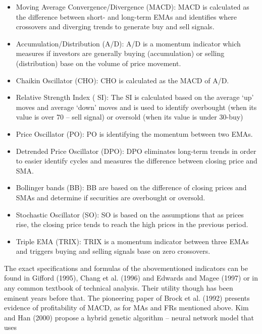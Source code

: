 \documentclass[12pt]{article}
\begin{document}
	\begin{itemize}
		\item Moving Average Convergence/Divergence (MACD):
		MACD is calculated as the
		difference between short- and long-term EMAs and identifies where crossovers and
		diverging trends to generate buy and sell signals.
		\item Accumulation/Distribution (A/D): A/D is a momentum indicator which measures if
		investors are generally buying (accumulation) or selling (distribution) base on the volume
		of price movement.
		\item Chaikin Oscillator (CHO): CHO is calculated as the MACD of A/D.
		
		\item Relative Strength Index ( SI): The SI is calculated based on the average ‘up’ moves and
		average ‘down’ moves and is used to identify overbought (when its value is over 70 – sell
		signal) or oversold (when its value is under 30-buy)
		
		\item Price Oscillator (PO): PO is identifying the momentum between two EMAs.
		
		\item Detrended Price Oscillator (DPO): DPO eliminates long-term trends in order to easier
		identify cycles and measures the difference between closing price and SMA.
		
		\item Bollinger bands (BB): BB are based on the difference of closing prices and SMAs and
		determine if securities are overbought or oversold.
		
		\item Stochastic Oscillator (SO): SO is based on the assumptions that as prices rise, the closing
		price tends to reach the high prices in the previous period.
		
		\item Triple EMA (TRIX): TRIX is a momentum indicator between three EMAs and triggers
		buying and selling signals base on zero crossovers.
	\end{itemize}
	The exact specifications and formulas of the abovementioned indicators can be found in Gifford
	(1995), Chang et al. (1996) and Edwards and Magee (1997) or in any common textbook of
	technical analysis. Their utility though has been eminent years before that. The pioneering paper of
	Brock et al. (1992) presents evidence of profitability of MACD, as for MAs and FRs mentioned
	above. Kim and Han (2000) propose a hybrid genetic algorithm – neural network model that uses
\end{document}
